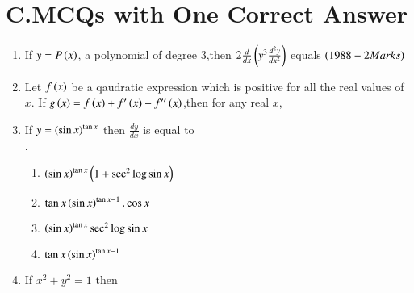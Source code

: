 \documentclass[journal,12pt,onecolumn]{IEEEtran}
\theoremstyle{remark}
\begin{document}
\section*{C.MCQs with One Correct Answer}
\begin{enumerate}
    \item If $y=P\left(x\right)$, a polynomial of degree 3,then $2\frac{d}{dx}\left(y^3\frac{d^2y}{dx^2}\right)$ equals
    $\hfill\brak{1988-2 Marks}$
\begin{enumerate}
\end{enumerate}
\item Let $f\left(x\right)$ be a qaudratic expression which is positive for all the real values of $x$. If $g\left(x\right) = f\left(x\right)+f^{\prime}\left(x\right)+f^{\prime\prime}\left(x\right)$,then for any real $x$,
\begin{enumerate}
\end{enumerate}
\item If $y=\left(\sin{x}\right)^{\tan{x}}$ then $\frac{dy}{dx}$ is equal to \\.\hfill{}
\begin{enumerate}
    \item $\left(\sin{x}\right)^{\tan{x}}\left(1+\sec^2{\log{\sin{x}}}\right)$
    \item $\tan{x}\left(\sin{x}\right)^{\tan{x}-1}.\cos{x}$
    \item $\left(\sin{x}\right)^{\tan{x}}\sec^2{\log{\sin{x}}}$
    \item $\tan{x}\left(\sin{x}\right)^{\tan{x}-1}$
\end{enumerate}
\item If $x^2+y^2=1$ then \hfill{}
\begin{enumerate}
\begin{multicols}{2}

\end{multicols}
\end{enumerate}
\end{enumerate}
\end{document}
